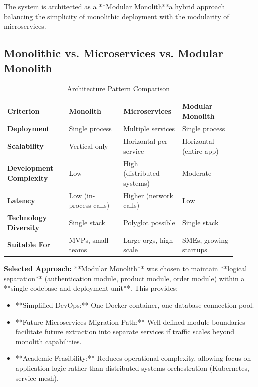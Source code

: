 \documentclass[12pt, a4paper]{report}
\begin{document}
The system is architected as a **Modular Monolith**a hybrid approach balancing the simplicity of monolithic deployment with the modularity of microservices.

\subsection{Monolithic vs. Microservices vs. Modular Monolith}

\begin{table}[H]
\centering
\caption{Architecture Pattern Comparison}
\label{tab:architecture_patterns}
\begin{tabular}{@{}p{0.25\linewidth}p{0.22\linewidth}p{0.22\linewidth}p{0.22\linewidth}@{}}
\toprule
\textbf{Criterion} & \textbf{Monolith} & \textbf{Microservices} & \textbf{Modular Monolith} \\
\midrule
\textbf{Deployment} & Single process & Multiple services & Single process \\
\textbf{Scalability} & Vertical only & Horizontal per service & Horizontal (entire app) \\
\textbf{Development Complexity} & Low & High (distributed systems) & Moderate \\
\textbf{Latency} & Low (in-process calls) & Higher (network calls) & Low \\
\textbf{Technology Diversity} & Single stack & Polyglot possible & Single stack \\
\textbf{Suitable For} & MVPs, small teams & Large orgs, high scale & SMEs, growing startups \\
\bottomrule
\end{tabular}
\end{table}

\textbf{Selected Approach:} **Modular Monolith** was chosen to maintain **logical separation** (authentication module, product module, order module) within a **single codebase and deployment unit**. This provides:

\begin{itemize}
    \item **Simplified DevOps:** One Docker container, one database connection pool.
    \item **Future Microservices Migration Path:** Well-defined module boundaries facilitate future extraction into separate services if traffic scales beyond monolith capabilities.
    \item **Academic Feasibility:** Reduces operational complexity, allowing focus on application logic rather than distributed systems orchestration (Kubernetes, service mesh).
\end{itemize}
\end{document}
